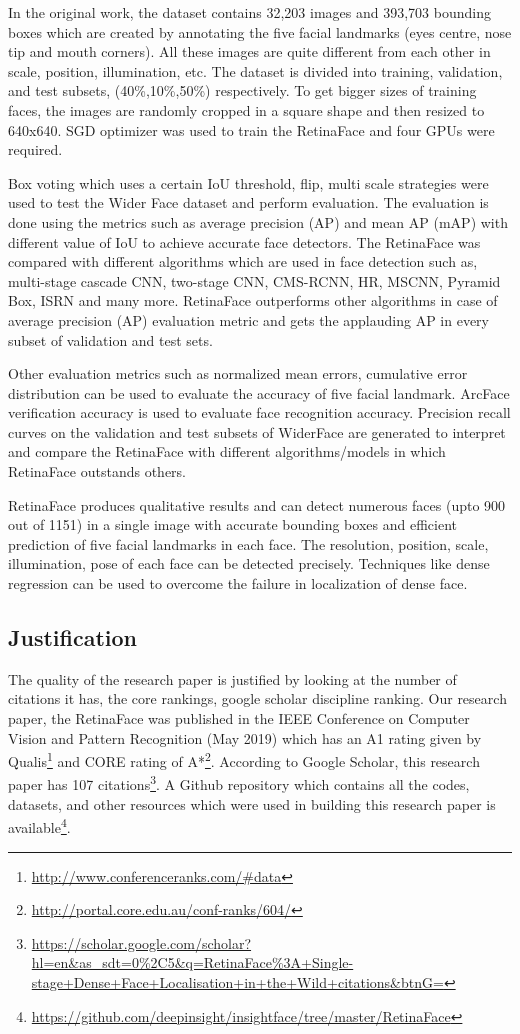 \documentclass{article}
\begin{document}
In the original work, the dataset contains 32,203 images and 393,703 bounding boxes which are created by annotating the five facial landmarks (eyes centre, nose tip and mouth corners). All these images are quite different from each other in scale, position, illumination, etc. The dataset is divided into training, validation, and test subsets, (40\%,10\%,50\%) respectively. To get bigger sizes of training faces, the images are randomly cropped in a square shape and then resized to 640x640. SGD optimizer was used to train the RetinaFace and four GPUs were required. 

Box voting which uses a certain IoU threshold, flip, multi scale strategies were used to test the Wider Face dataset and perform evaluation. The evaluation is done using the metrics such as average precision (AP) and mean AP (mAP) with different value of IoU to achieve accurate face detectors. The RetinaFace was compared with different algorithms which are used in face detection such as, multi-stage cascade CNN, two-stage CNN, CMS-RCNN, HR, MSCNN, Pyramid Box, ISRN and many more. RetinaFace outperforms other algorithms in case of average precision (AP) evaluation metric and gets the applauding AP in every subset of validation and test sets.

Other evaluation metrics such as normalized mean errors, cumulative error distribution can be used to evaluate the accuracy of five facial landmark. ArcFace verification accuracy is used to evaluate face recognition accuracy. Precision recall curves on the validation and test subsets of WiderFace are generated to interpret and compare the RetinaFace with different algorithms/models in which RetinaFace outstands others.

RetinaFace produces qualitative results and can detect numerous faces (upto 900 out of 1151) in a single image with accurate bounding boxes and efficient prediction of five facial landmarks in each face. The resolution, position, scale, illumination, pose of each face can be detected precisely. Techniques like dense regression can be used to overcome the failure in localization of dense face.
\subsection{Justification}	

The quality of the research paper is justified by looking at the number of citations it has, the core rankings, google scholar discipline ranking. Our research paper, the RetinaFace was published in the IEEE Conference on Computer Vision and Pattern Recognition (May 2019) which has an A1 rating given  by Qualis\footnote{ \url{ http://www.conferenceranks.com/#data} }  and CORE rating of A*\footnote{\url{http://portal.core.edu.au/conf-ranks/604/}}. According to Google Scholar, this research paper has 107 citations\footnote{\url{https://scholar.google.com/scholar?hl=en&as_sdt=0\%2C5&q=RetinaFace\%3A+Single-stage+Dense+Face+Localisation+in+the+Wild+citations&btnG=}}. A Github repository which contains all the codes, datasets, and other resources which were used in building this research paper is available\footnote{\url{https://github.com/deepinsight/insightface/tree/master/RetinaFace}}.
\end{document}
